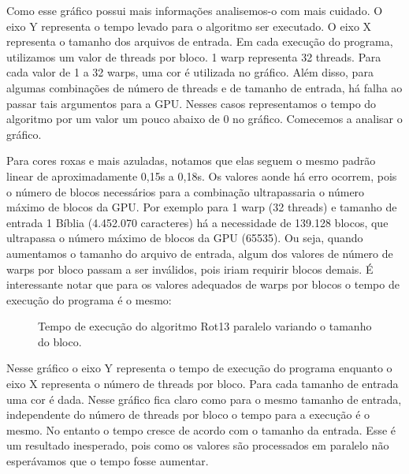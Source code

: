 \documentclass[12pt]{article}
\begin{document}
Como esse gráfico possui mais informações analisemos-o com mais cuidado.
O eixo Y representa o tempo levado para o algoritmo ser executado.
O eixo X representa o tamanho dos arquivos de entrada. Em cada execução
do programa, utilizamos um valor de threads por bloco. 1 warp 
representa 32 threads. Para cada valor de 1 a 32 warps, uma cor é
utilizada no gráfico. Além disso, para algumas combinações de número de
threads e de tamanho de entrada, há falha ao passar tais argumentos
para a GPU. Nesses casos representamos o tempo do algoritmo por um valor
um pouco abaixo de 0 no gráfico. Comecemos a analisar o gráfico.

Para cores roxas e mais azuladas, notamos que elas seguem o mesmo padrão
linear de aproximadamente 0,15s a 0,18s. Os valores aonde há erro
ocorrem, pois o número de blocos necessários para a combinação
ultrapassaria o número máximo de blocos da GPU. Por exemplo para 1 warp
(32 threads) e tamanho de entrada 1 Bíblia (4.452.070 caracteres) há a
necessidade de 139.128 blocos, que ultrapassa o número máximo de blocos
da GPU (65535). Ou seja, quando aumentamos o tamanho do arquivo de
entrada, algum dos valores de número de warps por bloco passam a ser
inválidos, pois iriam requirir blocos demais. É interessante notar que
para os valores adequados de warps por blocos o tempo de execução do
programa é o mesmo:

\begin{figure}[H]
    \caption{Tempo de execução do algoritmo Rot13 paralelo variando o
    tamanho do bloco.}
\end{figure}

Nesse gráfico o eixo Y representa o tempo de execução do programa
enquanto o eixo X representa o número de threads por bloco. Para cada
tamanho de entrada uma cor é dada. Nesse gráfico fica claro como para o
mesmo tamanho de entrada, independente do número de threads por bloco o
tempo para a execução é o mesmo. No entanto o tempo cresce de acordo com
o tamanho da entrada. Esse é um resultado inesperado, pois como os 
valores são processados em paralelo não esperávamos que o tempo fosse
aumentar.
\end{document}
